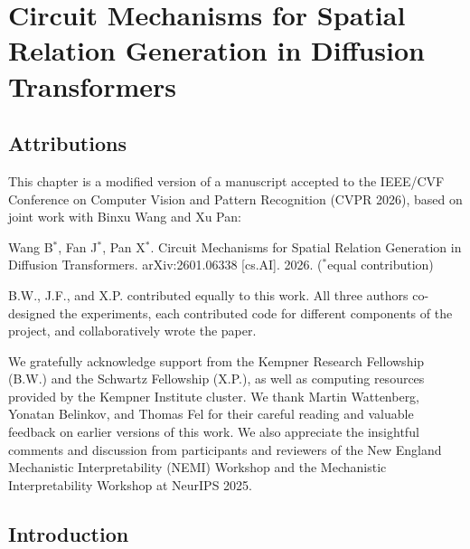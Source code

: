 \chapter{Circuit Mechanisms for Spatial Relation Generation in Diffusion Transformers}
\label{Appendix B}

\section{Attributions}

This chapter is a modified version of a manuscript accepted to the IEEE/CVF Conference on Computer Vision and Pattern Recognition (CVPR 2026), based on joint work with Binxu Wang and Xu Pan:

Wang B$^*$, Fan J$^*$, Pan X$^*$. Circuit Mechanisms for Spatial Relation Generation in Diffusion Transformers. arXiv:2601.06338 [cs.AI]. 2026. ($^*$equal contribution)

B.W., J.F., and X.P. contributed equally to this work. All three authors co-designed the experiments, each contributed code for different components of the project, and collaboratively wrote the paper.

We gratefully acknowledge support from the Kempner Research Fellowship (B.W.) and the Schwartz Fellowship (X.P.), as well as computing resources provided by the Kempner Institute cluster. We thank Martin Wattenberg, Yonatan Belinkov, and Thomas Fel for their careful reading and valuable feedback on earlier versions of this work. We also appreciate the insightful comments and discussion from participants and reviewers of the New England Mechanistic Interpretability (NEMI) Workshop and the Mechanistic Interpretability Workshop at NeurIPS 2025.

\section{Introduction}

